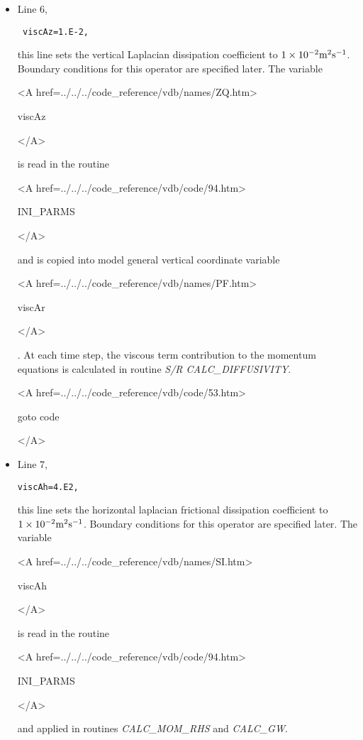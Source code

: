 \begin{itemize}
\item Line 6, 
\begin{verbatim} viscAz=1.E-2, \end{verbatim} 
this line sets the vertical Laplacian dissipation coefficient to
$1 \times 10^{-2} {\rm m^{2}s^{-1}}$. Boundary conditions
for this operator are specified later. 
The variable 
{\bf 
\begin{rawhtml} <A href=../../../code_reference/vdb/names/ZQ.htm> \end{rawhtml}
viscAz
\begin{rawhtml} </A>\end{rawhtml}
}
is read in the routine
{\it
\begin{rawhtml} <A href=../../../code_reference/vdb/code/94.htm> \end{rawhtml}
INI\_PARMS
\begin{rawhtml} </A>\end{rawhtml}
}
and is copied into model general vertical coordinate variable 
{\bf 
\begin{rawhtml} <A href=../../../code_reference/vdb/names/PF.htm> \end{rawhtml}
viscAr
\begin{rawhtml} </A>\end{rawhtml}
}. At each time step, the viscous term contribution to the momentum equations
is calculated in routine
{\it S/R CALC\_DIFFUSIVITY}.

{\bf
\begin{rawhtml} <A href=../../../code_reference/vdb/code/53.htm> \end{rawhtml}
goto code
\begin{rawhtml} </A>\end{rawhtml}
}

\item Line 7, 
\begin{verbatim}
viscAh=4.E2,
\end{verbatim} 
this line sets the horizontal laplacian frictional dissipation coefficient to
$1 \times 10^{-2} {\rm m^{2}s^{-1}}$. Boundary conditions
for this operator are specified later.
The variable 
{\bf 
\begin{rawhtml} <A href=../../../code_reference/vdb/names/SI.htm> \end{rawhtml}
viscAh
\begin{rawhtml} </A>\end{rawhtml}
}
is read in the routine
{\it
\begin{rawhtml} <A href=../../../code_reference/vdb/code/94.htm> \end{rawhtml}
INI\_PARMS
\begin{rawhtml} </A>\end{rawhtml}
} and applied in routines {\it CALC\_MOM\_RHS} and {\it CALC\_GW}.


\end{itemize}
